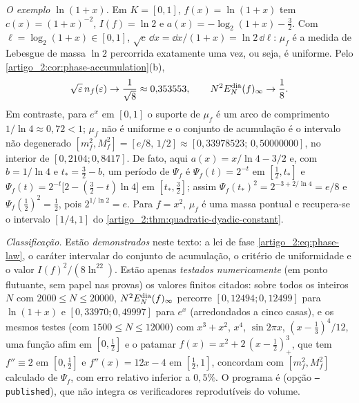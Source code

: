 \begin{remark}\label{map:artigo_2:12.9}
\label{artigo_2:rem:phase-examples}
\emph{O exemplo $\ln(1+x)$.} Em $K=[0,1]$, $f(x)=\ln(1+x)$ tem
$c(x)=(1+x)^{-2}$, $I(f)=\ln2$ e $a(x)=-\log_2(1+x)-\tfrac32$. Com
$\ell=\log_2(1+x)\in[0,1]$, $\sqrt{c}\,\dd x=\dd x/(1+x)=\ln2\,\dd\ell$:
$\mu_f$ é a medida de Lebesgue de massa $\ln2$ percorrida exatamente uma vez,
ou seja, é uniforme. Pelo \cref{artigo_2:cor:phase-accumulation}(b),
\[
 \sqrt\varepsilon\,n_f(\varepsilon)\to\frac1{\sqrt8}\approx0{,}353553,
 \qquad
 N^2E_N^{\rm dia}(f)_\infty\to\frac18 .
\]
Em contraste, para $e^x$ em $[0,1]$ o suporte de $\mu_f$ é um arco de
comprimento $1/\ln4\approx0{,}72<1$; $\mu_f$ não é uniforme e o conjunto de
acumulação é o intervalo não degenerado $[m_f^2,M_f^2]=[e/8,\,1/2]\approx[0{,}33978523;\,0{,}50000000]$,
no interior de $[0{,}2104;0{,}8417]$. De fato, aqui $a(x)=x/\ln4-3/2$ e, com
$b=1/\ln4$ e $t_*=\tfrac32-b$, um período de $\Psi_f$ é
$\Psi_f(t)=2^{-t}$ em $[\tfrac12,t_*]$ e
$\Psi_f(t)=2^{-t}\bigl[2-(\tfrac32-t)\ln4\bigr]$ em $[t_*,\tfrac32]$; assim
$\Psi_f(t_*)^2=2^{-3+2/\ln4}=e/8$ e $\Psi_f(\tfrac12)^2=\tfrac12$, pois $2^{1/\ln2}=e$.
Para $f=x^2$, $\mu_f$ é uma massa pontual e recupera-se o intervalo $[1/4,1]$ do
\cref{artigo_2:thm:quadratic-dyadic-constant}.

\emph{Classificação.} Estão \emph{demonstrados} neste texto: a lei de fase
\eqref{artigo_2:eq:phase-law}, o caráter intervalar do conjunto de acumulação, o
critério de uniformidade e o valor $I(f)^2/(8\ln^22)$. Estão apenas
\emph{testados numericamente} (em ponto flutuante, sem papel nas provas) os
valores finitos citados: sobre todos os inteiros $N$ com $2000\le N\le20000$,
$N^2E_N^{\rm dia}(f)_\infty$ percorre $[0{,}12494;0{,}12499]$ para $\ln(1+x)$ e
$[0{,}33970;0{,}49997]$ para $e^x$ (arredondados a cinco casas), e os mesmos testes (com $1500\le N\le12000$) com $x^3+x^2$, $x^4$, $\sin2\pi x$, $(x-\tfrac13)^4/12$,
uma função afim em $[0,\tfrac12]$ e o patamar $f(x)=x^2+2\,(x-\tfrac12)_+^3$,
que tem $f''\equiv2$ em $[0,\tfrac12]$ e $f''(x)=12x-4$ em $[\tfrac12,1]$, concordam
com $[m_f^2,M_f^2]$ calculado de $\Psi_f$, com erro relativo inferior a $0{,}5\%$.
O programa é  (opção \texttt{--published}), que não integra os
verificadores reprodutíveis do volume.


\end{remark}
